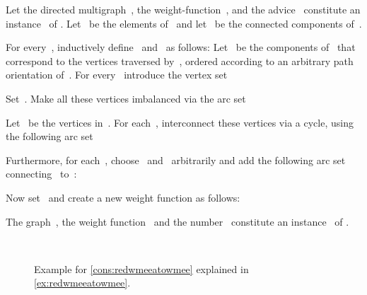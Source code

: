 \begin{construction}\label{cons:redwmeeatowmee}
  Let the directed multigraph~, the weight-function~, and the advice~ constitute an instance~ of \pWMEECLAs. Let~ be the elements of~ and let~ be the connected components of~.



  For every~, inductively define~ and~ as follows: Let~ be the components of~ that correspond to the vertices traversed by~, ordered according to an arbitrary path orientation of~. For every~ introduce the vertex set

Set~. Make all these vertices imbalanced via the arc set

Let~ be the vertices in~. For each~, interconnect these vertices via a cycle, using the following arc set

Furthermore, for each~, choose~ and~ arbitrarily and add the following arc set connecting~ to~:

Now set~ and create a new weight function as follows:


The graph~, the weight function~ and the number~ constitute an instance~ of \pWMEEs{}.
\end{construction}
\begin{figure}
  \begin{center}
     \\
    \caption{Example for \autoref{cons:redwmeeatowmee} explained in \autoref{ex:redwmeeatowmee}.}
    \label{fig:redwmeeatowmee}
  \end{center}
\end{figure}
